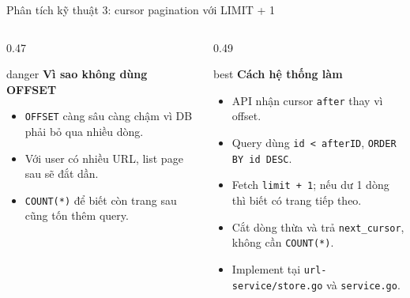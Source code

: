 \documentclass[aspectratio=169]{beamer}
\begin{document}
\begin{frame}{Phân tích kỹ thuật 3: cursor pagination với LIMIT + 1}
    \begin{columns}[T,onlytextwidth]
        \begin{column}{0.47\textwidth}
            \begin{claimbox}{danger}
                \textbf{Vì sao không dùng OFFSET}
                \begin{itemize}\small
                    \item \texttt{OFFSET} càng sâu càng chậm vì DB phải bỏ qua nhiều dòng.
                    \item Với user có nhiều URL, list page sau sẽ đắt dần.
                    \item \texttt{COUNT(*)} để biết còn trang sau cũng tốn thêm query.
                \end{itemize}
            \end{claimbox}
        \end{column}
        \begin{column}{0.49\textwidth}
            \begin{claimbox}{best}
                \textbf{Cách hệ thống làm}
                \begin{itemize}\small
                    \item API nhận cursor \texttt{after} thay vì offset.
                    \item Query dùng \texttt{id < afterID}, \texttt{ORDER BY id DESC}.
                    \item Fetch \texttt{limit + 1}; nếu dư 1 dòng thì biết có trang tiếp theo.
                    \item Cắt dòng thừa và trả \texttt{next\_cursor}, không cần \texttt{COUNT(*)}.
                    \item Implement tại \texttt{url-service/store.go} và \texttt{service.go}.
                \end{itemize}
            \end{claimbox}
        \end{column}
    \end{columns}
\end{frame}
\end{document}
